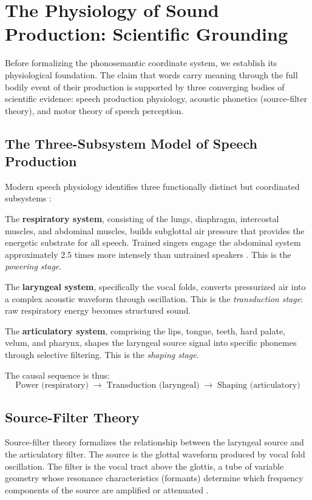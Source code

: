 \documentclass[12pt]{article}
\begin{document}
\section{The Physiology of Sound Production: Scientific Grounding}

Before formalizing the phonosemantic coordinate system, we establish its physiological foundation. The claim that words carry meaning through the full bodily event of their production is supported by three converging bodies of scientific evidence: speech production physiology, acoustic phonetics (source-filter theory), and motor theory of speech perception.

\subsection{The Three-Subsystem Model of Speech Production}

Modern speech physiology identifies three functionally distinct but coordinated subsystems \cite{zemlin1998, kent1997}:

The \textbf{respiratory system}, consisting of the lungs, diaphragm, intercostal muscles, and abdominal muscles, builds subglottal air pressure that provides the energetic substrate for all speech. Trained singers engage the abdominal system approximately 2.5 times more intensely than untrained speakers \cite{sundberg1987}. This is the \textit{powering stage}.

The \textbf{laryngeal system}, specifically the vocal folds, converts pressurized air into a complex acoustic waveform through oscillation. This is the \textit{transduction stage}: raw respiratory energy becomes structured sound.

The \textbf{articulatory system}, comprising the lips, tongue, teeth, hard palate, velum, and pharynx, shapes the laryngeal source signal into specific phonemes through selective filtering. This is the \textit{shaping stage}.

The causal sequence is thus:
\[
\text{Power (respiratory)} \;\to\; \text{Transduction (laryngeal)} \;\to\; \text{Shaping (articulatory)}
\]

\subsection{Source-Filter Theory}

Source-filter theory \cite{fant1960} formalizes the relationship between the laryngeal source and the articulatory filter. The source is the glottal waveform produced by vocal fold oscillation. The filter is the vocal tract above the glottis, a tube of variable geometry whose resonance characteristics (formants) determine which frequency components of the source are amplified or attenuated \cite{peterson1952}.
\end{document}
